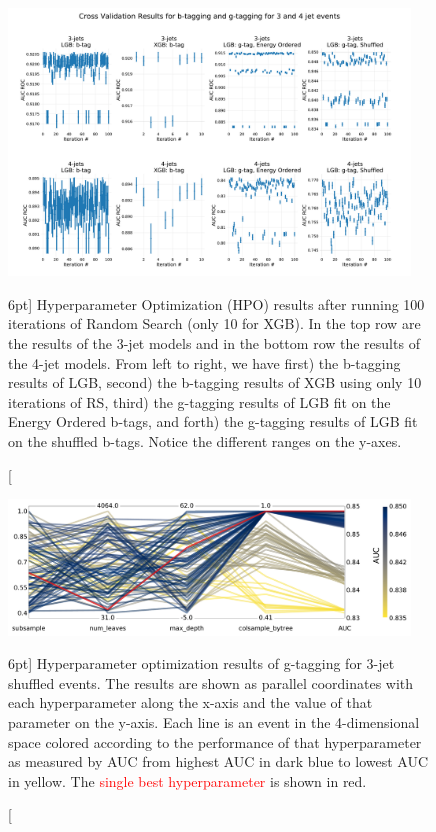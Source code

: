 \documentclass[a4paper, twoside]{tufte-book}
\begin{document}
\begin{figure}
  \includegraphics[width=0.95\textwidth, trim=10 10 10 60, clip]{figures/quarks/cv_res_lgb-down_sample=1.00-ML_vars=vertex-selection=b-ejet_min=4-n_iter_RS_lgb=99-n_iter_RS_xgb=9-cdot_cut=0.90-version=19.pdf}
  \caption[Hyperparameter Optimization of b- and g-tagging][6pt]
          {Hyperparameter Optimization (HPO) results after running 100 iterations of Random Search (only 10 for XGB). In the top row are the results of the 3-jet models and in the bottom row the results of the 4-jet models. From left to right, we have first) the b-tagging results of LGB, second) the b-tagging results of XGB using only 10 iterations of RS, third) the g-tagging results of LGB fit on the Energy Ordered b-tags, and forth) the g-tagging results of LGB fit on the shuffled b-tags. Notice the different ranges on the y-axes.
          } 
  \label{fig:q:CV_res_iterations}
\end{figure}


\begin{figure}
  \includegraphics[width=0.95\textwidth, trim=0 0 0 0, clip]{figures/quarks/CV_viz-njet=3-name=lf_gtag_shuffled_lgb_down_sample=1.00-ML_vars=vertex-selection=b-ejet_min=4-n_iter_RS_lgb=99-n_iter_RS_xgb=9-cdot_cut=0.90-version=19.pdf}
  \caption[Overview of Hyperparamaters of g-tagging for 3-jet shuffled events][6pt]
          {Hyperparameter optimization results of g-tagging for 3-jet shuffled events. The results are shown as parallel coordinates with each hyperparameter along the x-axis and the value of that parameter on the y-axis. Each line is an event in the 4-dimensional space colored according to the performance of that hyperparameter as measured by AUC from \textcolor{viridis-dark}{highest} AUC in dark blue to \textcolor{viridis-light}{lowest} AUC in yellow. The \textcolor{red}{single best hyperparameter} is shown in red. 
          } 
  \label{fig:q:CV_res_parallel_coords}
\end{figure}
\end{document}
